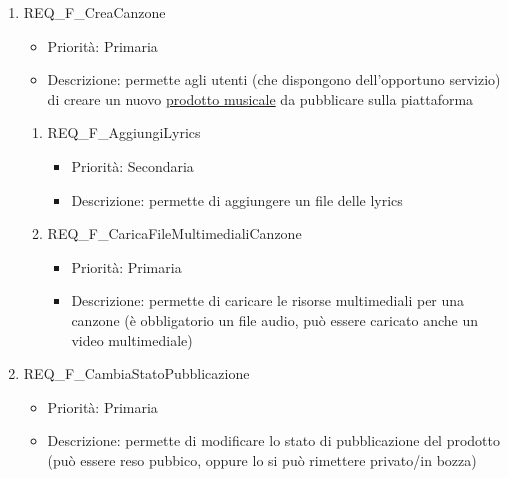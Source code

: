 \begin{enumerate}
\begin{enumerate}[label*=\arabic*.]
		\item REQ\_F\_CreaCanzone
			\begin{itemize}
			\item Priorità: Primaria
			\item Descrizione: permette agli utenti (che dispongono dell'opportuno servizio) di creare un nuovo \hyperlink{AnReqMusicali}{prodotto musicale} da pubblicare sulla piattaforma
			\end{itemize}
			\begin{enumerate}[label*=\arabic*.]
			\item REQ\_F\_AggiungiLyrics
				\begin{itemize}
				\item Priorità: Secondaria
				\item Descrizione: permette di aggiungere un file delle lyrics
				\end{itemize}
			\item REQ\_F\_CaricaFileMultimedialiCanzone
				\begin{itemize}
				\item Priorità: Primaria
				\item Descrizione: permette di caricare le risorse multimediali per una canzone (è obbligatorio un file audio, può essere caricato anche un video multimediale)
				\end{itemize}
			\end{enumerate}	
		
		\item REQ\_F\_CambiaStatoPubblicazione
			\begin{itemize}
			\item Priorità: Primaria
			\item Descrizione: permette di modificare lo stato di pubblicazione del prodotto (può essere reso pubbico, oppure lo si può rimettere privato/in bozza)
			\end{itemize}		
		\end{enumerate}
	

\end{enumerate}
